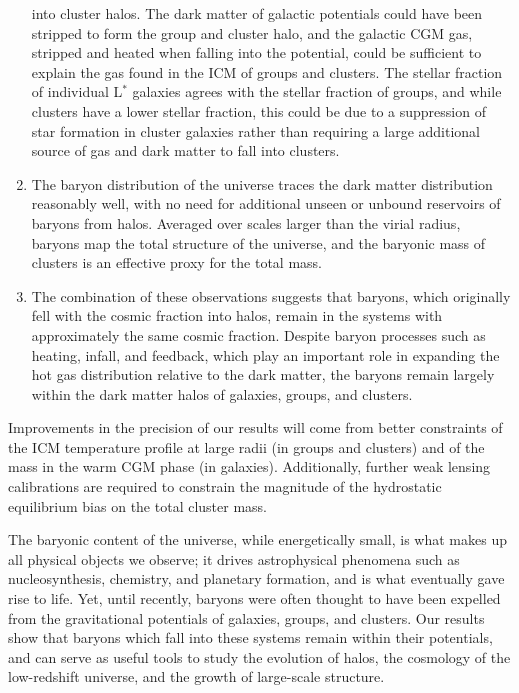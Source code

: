 \begin{enumerate}
  into cluster halos. The dark matter of galactic potentials could
  have been stripped to form the group and cluster halo, and the
  galactic CGM gas, stripped and heated when falling into the
  potential, could be sufficient to explain the gas found in the ICM
  of groups and clusters. The stellar fraction of individual L$^*$
  galaxies agrees with the stellar fraction of groups, and while
  clusters have a lower stellar fraction, this could be due to a
  suppression of star formation in cluster galaxies rather than
  requiring a large additional source of gas and dark matter to fall
  into clusters.
\item The baryon distribution of the universe traces the dark matter
  distribution reasonably well, with no need for additional unseen or
  unbound reservoirs of baryons from halos. Averaged over scales
  larger than the virial radius, baryons map the total structure of
  the universe, and the baryonic mass of clusters is an effective
  proxy for the total mass.
\item The combination of these observations suggests that baryons,
  which originally fell with the cosmic fraction into halos, remain in
  the systems with approximately the same cosmic fraction. Despite
  baryon processes such as heating, infall, and feedback, which play
  an important role in expanding the hot gas distribution relative to
  the dark matter, the baryons remain largely within the dark matter
  halos of galaxies, groups, and clusters.
\end{enumerate}

Improvements in the precision of our results will come from better
constraints of the ICM temperature profile at large radii (in groups
and clusters) and of the mass in the warm CGM phase (in
galaxies). Additionally, further weak lensing calibrations are
required to constrain the magnitude of the hydrostatic equilibrium
bias on the total cluster mass.

The baryonic content of the universe, while energetically small, is
what makes up all physical objects we observe; it drives astrophysical
phenomena such as nucleosynthesis, chemistry, and planetary formation,
and is what eventually gave rise to life. Yet, until recently, baryons
were often thought to have been expelled from the gravitational
potentials of galaxies, groups, and clusters. Our results show that
baryons which fall into these systems remain within their potentials,
and can serve as useful tools to study the evolution of halos, the
cosmology of the low-redshift universe, and the growth of large-scale
structure.
